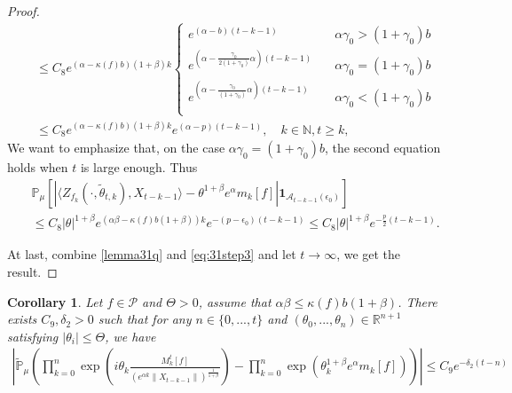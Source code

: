 \documentclass[12pt,oneside,english]{amsart}
\theoremstyle{plain}
\newtheorem{cor}[thm]{Corollary}
\theoremstyle{definition}
\numberwithin{equation}{section}
\begin{document}
\begin{proof}
\begin{align}
    &\leq C_8 e^{(\alpha-\kappa(f)b)(1+\beta)k}
    \begin{cases}
    e^{(\alpha-b)(t-k-1)}\quad &\alpha\gamma_0>(1+\gamma_0)b\\
    e^{(\alpha-\frac{\gamma_0}{2(1+\gamma_0)}\alpha)(t-k-1)}\quad &\alpha\gamma_0=(1+\gamma_0)b\\
    e^{(\alpha-\frac{\gamma_0}{(1+\gamma_0)}\alpha)(t-k-1)}\quad &\alpha\gamma_0<(1+\gamma_0)b\\
    \end{cases}
    \\& \leq C_8 e^{(\alpha-\kappa(f)b)(1+\beta)k}e^{(\alpha-p)(t-k-1)}, \quad k\in \mathbb{N}, t\geq k,
\end{align}
We want to emphasize that, on the case $\alpha\gamma_0=(1+\gamma_0)b$, the second equation holds when $t$ is large enough. Thus
\begin{align}
    &\mathbb{P}_{\mu}\left[\left|\langle Z_{f_k}(\cdot,\tilde{\theta}_{t,k}),X_{t-k-1}\rangle-\theta^{1+\beta}e^{\alpha}m_k[f]\right|\mathbf{1}_{\mathcal{A}_{t-k-1}(\epsilon_0)}\right]
    \\ & \leq C_8 |\theta|^{1+\beta}e^{(\alpha\beta-\kappa(f)b(1+\beta))k}e^{-(p-\epsilon_0)(t-k-1)} \leq C_8 |\theta|^{1+\beta}e^{-\frac{p}{2}(t-k-1)}.
\end{align}

At last, combine \eqref{lemma31q} and \eqref{eq:31step3} and let $t\rightarrow\infty$, we get the result.
\end{proof}
\begin{cor}\label{corollary31}
Let $f\in \mathcal{P}$ and $\Theta>0$, assume that $\alpha\beta\leq\kappa(f)b(1+\beta)$. There exists $C_9,\delta_2>0$ such that for any $n \in \{0,...,t\}$ and $(\theta_0,...,\theta_n)\in \mathbb{R}^{n+1}$ satisfying $|\theta_i|\leq \Theta$, we have
\begin{align}
\label{32corollary}
    \left|\mathbb{\tilde{P}}_{\mu}\left(\prod_{k=0}^n\exp(i\theta_k \frac {M_k^t[f]}{(e^{\alpha k}\|X_{t-k-1}\|)^\frac{1}{1+\beta}})-\prod_{k=0}^n\exp(\theta_k^{1+\beta}e^{\alpha}m_k[f])\right)\right|\leq C_9 e^{-\delta_2(t-n)}
\end{align}
\end{cor}
\end{document}
